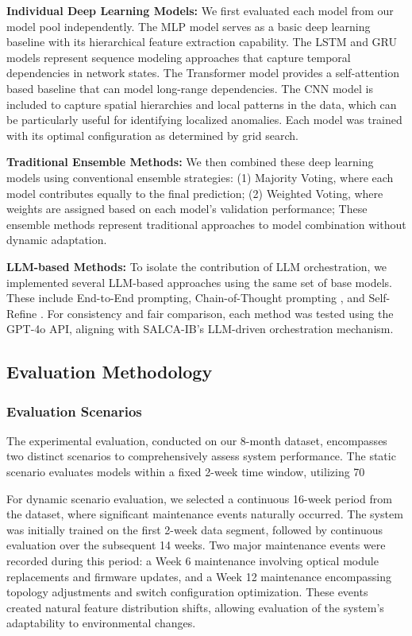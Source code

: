 \documentclass[conference]{IEEEtran}
\begin{document}
\textbf{Individual Deep Learning Models:} We first evaluated each model from our model pool independently. The MLP model serves as a basic deep learning baseline with its hierarchical feature extraction capability. The LSTM and GRU models represent sequence modeling approaches that capture temporal dependencies in network states. The Transformer model provides a self-attention based baseline that can model long-range dependencies. The CNN model is included to capture spatial hierarchies and local patterns in the data, which can be particularly useful for identifying localized anomalies. Each model was trained with its optimal configuration as determined by grid search.

\textbf{Traditional Ensemble Methods:} We then combined these deep learning models using conventional ensemble strategies:
(1) Majority Voting, where each model contributes equally to the final prediction;
(2) Weighted Voting, where weights are assigned based on each model's validation performance;
These ensemble methods represent traditional approaches to model combination without dynamic adaptation.

\textbf{LLM-based Methods:} To isolate the contribution of LLM orchestration, we implemented several LLM-based approaches using the same set of base models. These include End-to-End prompting, Chain-of-Thought prompting \cite{chen2023}, and Self-Refine \cite{madaan2023}. For consistency and fair comparison, each method was tested using the GPT-4o API, aligning with SALCA-IB's LLM-driven orchestration mechanism.

\subsection{Evaluation Methodology}

\subsubsection{Evaluation Scenarios}
The experimental evaluation, conducted on our 8-month dataset, encompasses two distinct scenarios to comprehensively assess system performance. The static scenario evaluates models within a fixed 2-week time window, utilizing 70%

For dynamic scenario evaluation, we selected a continuous 16-week period from the dataset, where significant maintenance events naturally occurred. The system was initially trained on the first 2-week data segment, followed by continuous evaluation over the subsequent 14 weeks. Two major maintenance events were recorded during this period: a Week 6 maintenance involving optical module replacements and firmware updates, and a Week 12 maintenance encompassing topology adjustments and switch configuration optimization. These events created natural feature distribution shifts, allowing evaluation of the system's adaptability to environmental changes.
\end{document}

